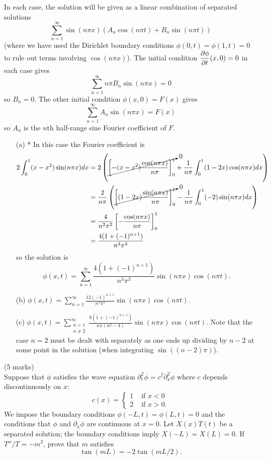 \documentclass[12pt]{article}
\begin{document}
\begin{answer}
In each case, the solution will be given as a linear combination of separated solutions
\[\sum_{n=1}^{\infty}\sin(n\pi x)(A_n\cos(n\pi t)+B_n\sin(n\pi t))\]
(where we have used the Dirichlet boundary conditions $\phi(0,t)=\phi(1,t)=0$ to rule out terms involving $\cos(n\pi x)$). The initial condition $\dfrac{\partial \phi}{\partial t}(x,0)=0$ in each case gives
\[\sum_{n=1}^{\infty}n\pi B_n\sin(n\pi x)=0\]
so $B_n=0$. The other initial condition $\phi(x,0)=F(x)$ gives
\[\sum_{n=1}^{\infty}A_n\sin(n\pi x)=F(x)\]
so $A_n$ is the $n$th half-range sine Fourier coefficient of $F$.
\begin{enumerate}
\item[(a)] * In this case the Fourier coefficient is
\begin{align*}
2\int_0^1(x-x^2)\sin(n\pi x)dx&=2\left(\cancelto{0}{\left[-(x-x^2)\frac{\cos(n\pi x)}{n\pi}\right]_0^1}+\frac{1}{n\pi}\int_0^1(1-2x)\cos(n\pi x)dx\right)\\
&=\frac{2}{n\pi}\left(\cancelto{0}{\left[(1-2x)\frac{\sin(n\pi x)}{n\pi}\right]_0^1}-\frac{1}{n\pi}\int_0^1(-2)\sin(n\pi x)dx\right)\\
&=\frac{4}{n^2\pi^2}\left[-\frac{\cos(n\pi x)}{n\pi}\right]_0^1\\
&=\frac{4(1+(-1)^{n+1})}{n^3\pi^3}
\end{align*}
so the solution is
\[\phi(x,t)=\sum_{n=1}^{\infty}\frac{4(1+(-1)^{n+1})}{n^3\pi^3}\sin(n\pi x)\cos(n\pi t).\]
\item[(b)] $\phi(x,t)=\sum_{n=1}^{\infty}\frac{12(-1)^{n+1}}{n^3\pi^3}\sin(n\pi x)\cos(n\pi t)$.
\item[(c)] $\phi(x,t)=\sum_{\substack{n=1\\ n\neq 2}}^{\infty}\frac{8(1+(-1)^{n+1})}{n\pi(n^2-4)}\sin(n\pi x)\cos(n\pi t)$. Note that the case $n=2$ must be dealt with separately as one ends up dividing by $n-2$ at some point in the solution (when integrating $\sin((n-2)\pi)$).
\end{enumerate}
\end{answer}
\newpage


\begin{question}(5 marks)\\
Suppose that $\phi$ satisfies the wave equation $\partial_t^2\phi=c^2\partial_x^2\phi$ where $c$ depends discontinuously on $x$:
\[c(x)=\begin{cases}
1 &\mbox{ if }x<0\\
2 &\mbox{ if }x>0.
\end{cases}\]
We impose the boundary conditions $\phi(-L,t)=\phi(L,t)=0$ and the conditions that $\phi$ and $\partial_x\phi$ are continuous at $x=0$. Let $X(x)T(t)$ be a separated solution; the boundary conditions imply $X(-L)=X(L)=0$. If $T''/T=-m^2$, prove that $m$ satisfies
\[\tan(mL)=-2\tan(mL/2).\]
\end{question}
\end{document}
